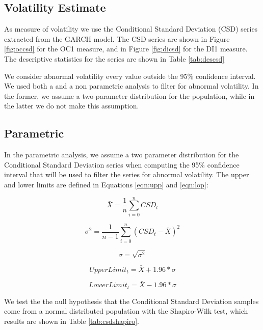 \documentclass[cic,tc, english]{iiufrgs}
\begin{document}
\subsection{Volatility Estimate}

    As measure of volatility we use the Conditional Standard Deviation (CSD) series extracted from the GARCH model. The CSD series are shown in Figure \ref{fig:occsd} for the OC1 measure, and in Figure \ref{fig:dicsd} for the DI1 measure. The descriptive statistics for the series are shown in Table \ref{tab:descsd}

    

    

    

    We consider abnormal volatility every value outside the 95\% confidence interval. We used both a  and a non parametric analysis to filter for abnormal volatility. In the former, we assume a two-parameter distribution for the population, while in the latter we do not make this assumption.

\subsection{Parametric}

    In the parametric analysis, we assume a two parameter distribution for the Conditional Standard Deviation series when computing the 95\% confidence interval that will be used to filter the series for abnormal volatility. The upper and lower limits are defined in Equations \ref{eqn:upp} and \ref{eqn:lop}: 

    $$\bar{X} = \frac{1}{n} \displaystyle\sum_{i=0}^{n} CSD_t$$

    $$\sigma^2 = \frac{1}{n-1} \displaystyle\sum_{i=0}^{n} (CSD_t - \bar{X})^2$$

    $$\sigma = \sqrt{\sigma^2}$$

    \begin{equation}
        \label{eqn:upp}
        UpperLimit_t = \bar{X} + 1.96 * \sigma
    \end{equation}

    \begin{equation}
        \label{eqn:lop}
        LowerLimit_t = \bar{X} - 1.96 * \sigma
    \end{equation}

    We test the the null hypothesis that the Conditional Standard Deviation samples come from a normal distributed population with the Shapiro-Wilk test, which results are shown in Table \ref{tab:csdshapiro}.
\end{document}
